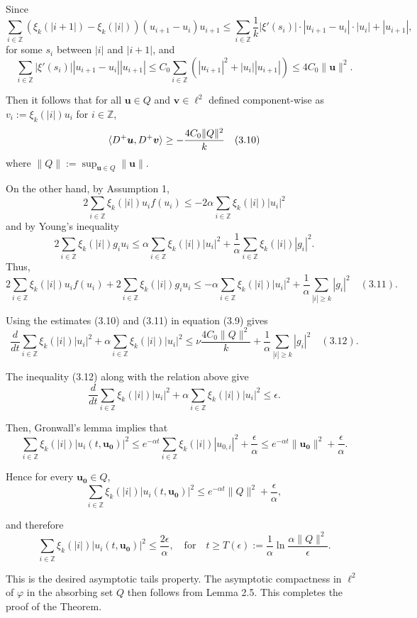 \documentclass[11pt]{beamer}
\begin{document}
\begin{frame}
    Since
\[
\sum_{i \in \mathbb{Z}} \left( \xi_k(|i+1|) - \xi_k(|i|) \right) (u_{i+1} - u_i) u_{i+1} \leq \sum_{i \in \mathbb{Z}} \frac{1}{k} |\xi'(s_i)| \cdot |u_{i+1} - u_i| \cdot |u_i| + |u_{i+1}|,
\]
for some $s_i$ between $|i|$ and $|i+1|$, and
\[
\sum_{i \in \mathbb{Z}} |\xi'(s_i)| |u_{i+1} - u_i| |u_{i+1}| \leq C_0 \sum_{i \in \mathbb{Z}} \left( |u_{i+1}|^2 + |u_i| |u_{i+1}| \right) \leq 4C_0 \|\boldsymbol{u}\|^2.
\]

Then it follows that for all $\boldsymbol{u} \in Q$ and $\boldsymbol{v} \in \ell^2$ defined component-wise as $v_i := \xi_k(|i|) u_i$ for $i \in \mathbb{Z}$,
\[
\langle \mathnormal{D}^+ \boldsymbol{u}, \mathnormal{D}^+ \boldsymbol{v} \rangle \geq - \frac{4C_0 \|Q\|^2}{k}  \quad (3.10)
\]
where $\|Q\| := \sup_{\boldsymbol{u} \in Q} \|\boldsymbol{u}\|$.

\end{frame}

\begin{frame}
    On the other hand, by Assumption 1,
\[
2 \sum_{i \in \mathbb{Z}} \xi_k(|i|) u_i f(u_i) \leq -2 \alpha \sum_{i \in \mathbb{Z}} \xi_k(|i|) |u_i|^2
\]
and by Young's inequality
\[
2 \sum_{i \in \mathbb{Z}} \xi_k(|i|) g_i u_i \leq \alpha \sum_{i \in \mathbb{Z}} \xi_k(|i|) |u_i|^2 + \frac{1}{\alpha} \sum_{i \in \mathbb{Z}} \xi_k(|i|) |g_i|^2.
\]
Thus,
\[
2 \sum_{i \in \mathbb{Z}} \xi_k(|i|) u_i f(u_i) + 2 \sum_{i \in \mathbb{Z}} \xi_k(|i|) g_i u_i 

\leq -\alpha \sum_{i \in \mathbb{Z}} \xi_k(|i|) |u_i|^2 + \frac{1}{\alpha} \sum_{|i| \geq k} |g_i|^2 \quad (3.11).
\]

Using the estimates (3.10) and (3.11) in equation (3.9) gives
\[
\frac{d}{dt} \sum_{i \in \mathbb{Z}} \xi_k(|i|) |u_i|^2 + \alpha \sum_{i \in \mathbb{Z}} \xi_k(|i|) |u_i|^2 \leq \nu \frac{4C_0 \|Q\|^2}{k} + \frac{1}{\alpha} \sum_{|i| \geq k} |g_i|^2 \quad (3.12).
\]

\end{frame}

\begin{frame}
    The inequality (3.12) along with the relation above give
\[
\frac{d}{dt} \sum_{i \in \mathbb{Z}} \xi_k(|i|) |u_i|^2 + \alpha \sum_{i \in \mathbb{Z}} \xi_k(|i|) |u_i|^2 \leq \epsilon.
\]

Then, Gronwall's lemma implies that
\[
\sum_{i \in \mathbb{Z}} \xi_k(|i|) |u_i(t, \boldsymbol{u_0})|^2 \leq e^{-\alpha t} \sum_{i \in \mathbb{Z}} \xi_k(|i|) |u_{0,i}|^2 + \frac{\epsilon}{\alpha} \leq e^{-\alpha t} \|\boldsymbol{u_0}\|^2 + \frac{\epsilon}{\alpha}.
\]

Hence for every $\boldsymbol{u_0} \in Q$,
\[
\sum_{i \in \mathbb{Z}} \xi_k(|i|) |u_i(t, \boldsymbol{u_0})|^2 \leq e^{-\alpha t} \|Q\|^2 + \frac{\epsilon}{\alpha},
\]

and therefore
\[
\sum_{i \in \mathbb{Z}} \xi_k(|i|) |u_i(t, \boldsymbol{u_0})|^2 \leq \frac{2 \epsilon}{\alpha}, \quad \text{for} \quad t \geq T(\epsilon) := \frac{1}{\alpha} \ln \frac{\alpha \|Q\|^2}{\epsilon}.
\]

\end{frame}

\begin{frame}
    This is the desired asymptotic tails property. The asymptotic compactness in $\ell^2$ of $\varphi$ in the absorbing set $Q$ then follows from Lemma 2.5. This completes the proof of the Theorem.

\end{frame}
\end{document}
